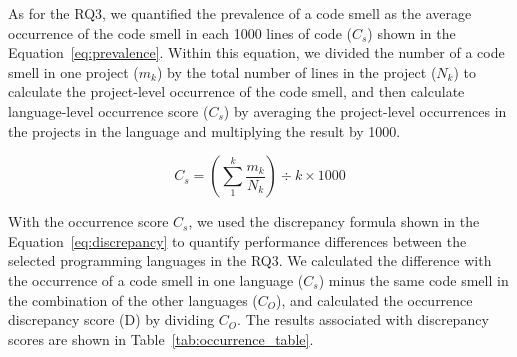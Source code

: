 
As for the RQ3, we quantified the prevalence of a code smell as the average
occurrence of the code smell in each 1000 lines of code ($C_{s}$) shown in the
Equation~\ref{eq:prevalence}. Within this equation, we divided the number of a
code smell in one project ($m_{k}$) by the total number of lines in the project
($N_{k}$) to calculate the project-level occurrence of the code smell, and then
calculate language-level occurrence score ($C_{s}$) by averaging the
project-level occurrences in the projects in the language and multiplying the
result by 1000.


\begin{equation}
C_{s} = \left( \sum_{1}^{k}{\frac{m_{k}}{N_{k}}} \right) \div k \times 1000
\label{eq:prevalence}
\end{equation}


With the occurrence score $C_{s}$, we used the discrepancy formula shown in
the Equation~\ref{eq:discrepancy} to quantify performance differences between
the selected programming languages in the RQ3. We calculated the difference with
the occurrence of a code smell in one language ($C_{s}$) minus the same code
smell in the combination of the other languages ($C_{O}$), and calculated the
occurrence discrepancy score (D) by dividing $C_{O}$. The results associated
with discrepancy scores are shown in Table~\ref{tab:occurrence_table}.

